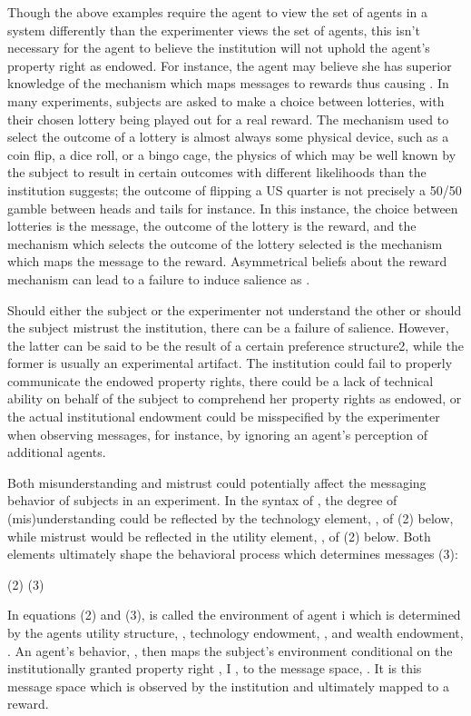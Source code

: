 Though the above examples require the agent to view the set of agents in a system differently than the experimenter views the set of agents, this isn't necessary for the agent to believe the institution will not uphold the agent's property right as endowed.
For instance, the agent may believe she has superior knowledge of the mechanism which maps messages to rewards thus causing .
In many experiments, subjects are asked to make a choice between lotteries, with their chosen lottery being played out for a real reward.
The mechanism used to select the outcome of a lottery is almost always some physical device, such as a coin flip, a dice roll, or a bingo cage, the physics of which may be well known by the subject to result in certain outcomes with different likelihoods than the institution suggests; the outcome of flipping a US quarter is not precisely a 50/50 gamble between heads and tails for instance.
In this instance, the choice between lotteries is the message, the outcome of the lottery is the reward, and the mechanism which selects the outcome of the lottery selected is the mechanism which maps the message to the reward.
Asymmetrical beliefs about the reward mechanism can lead to a failure to induce salience as .

Should either the subject or the experimenter not understand the other or should the subject mistrust  the institution, there can be a failure of salience.
However, the latter can be said to be the result of a certain preference structure2, while the former is usually an experimental artifact.
The institution could fail to properly communicate the endowed property rights, there could be a lack of technical ability on behalf of the subject to comprehend her property rights as endowed, or the actual institutional endowment could be misspecified by the experimenter when observing messages, for instance, by ignoring an agent's perception of additional agents.


Both misunderstanding and mistrust could potentially affect the  messaging behavior of subjects in an experiment.
In the syntax of \textcite{Smith1982}⁠, the degree of (mis)understanding could be reflected by the technology element, , of (2) below, while mistrust would be reflected in the utility element, , of (2) below.
Both elements ultimately shape the behavioral process which determines messages (3):

(2)	
(3)	

In equations (2) and (3),  is called the environment of agent i which is determined by the agents utility structure, , technology endowment, , and wealth endowment, .
An agent's behavior, , then maps the subject's environment conditional on the institutionally granted property right , I , to the message space, .
It is this message space which is observed by the institution and ultimately mapped to a reward.


